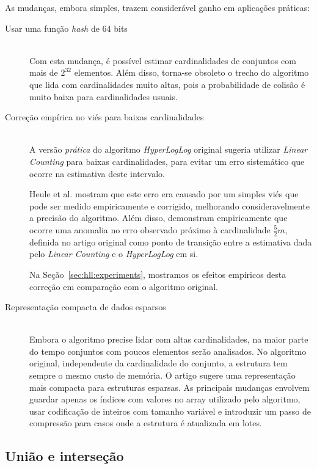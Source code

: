 As mudanças, embora simples, trazem considerável ganho em aplicações práticas:

\begin{description}
  \item[Usar uma função \emph{hash} de 64 bits] \hfill \\
    Com esta mudança, é possível estimar cardinalidades de conjuntos com mais de $2^{32}$ elementos. Além disso, torna-se obsoleto o trecho do algoritmo que lida com cardinalidades muito altas, pois a probabilidade de colisão é muito baixa para cardinalidades usuais. 
  
  \item[Correção empírica no viés para baixas cardinalidades] \hfill \\
    A versão \emph{prática} do algoritmo \emph{HyperLogLog} original sugeria utilizar \emph{Linear Counting} para baixas cardinalidades, para evitar um erro sistemático que ocorre na estimativa deste intervalo. 
    
    Heule et al. mostram que este erro era causado por um simples viés que pode ser medido empiricamente e corrigido, melhorando consideravelmente a precisão do algoritmo. Além disso, demonstram empiricamente que ocorre uma anomalia no erro observado próximo à cardinalidade $\frac{5}{2}m$, definida no artigo original como ponto de transição entre a estimativa dada pelo \emph{Linear Counting} e o \emph{HyperLogLog} em si.
    
    Na Seção~\ref{sec:hll:experiments}, mostramos os efeitos empíricos desta correção em comparação com o algoritmo original.

  \item[Representação compacta de dados esparsos] \hfill \\
    Embora o algoritmo precise lidar com altas cardinalidades, na maior parte do tempo conjuntos com poucos elementos serão analisados. No algoritmo original, independente da cardinalidade do conjunto, a estrutura tem sempre o mesmo custo de memória. O artigo sugere uma representação mais compacta para estruturas esparsas. As principais mudanças envolvem guardar apenas os índices com valores no array utilizado pelo algoritmo, usar codificação de inteiros com tamanho variável e introduzir um passo de compressão para casos onde a estrutura é atualizada em lotes.
    
\end{description}

\subsection{União e interseção}\label{sec:hll:intersection}

